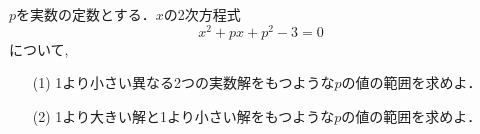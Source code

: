 \documentclass[8pt,dvipdfmx]{article}
\begin{document}
\begin{tcolorbox}[title=数学\textcircled{1} 2- 4 A ]
\(p\)を実数の定数とする．\(x\)の2次方程式
\[x^2 +px +p^2 -3 =0\]
について,
\begin{enumerate}
\item[(1)] 1より小さい異なる2つの実数解をもつような\(p\)の値の範囲を求めよ．
    \vspace{2mm} %
    \item[(2)]1より大きい解と1より小さい解をもつような\(p\)の値の範囲を求めよ．
\end{enumerate}
\end{tcolorbox}



\end{document}
